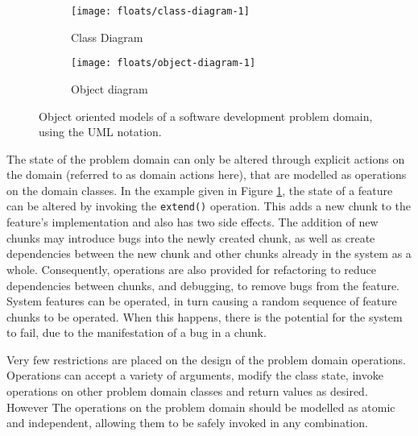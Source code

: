 \documentclass{sig-alternate}
\begin{document}
\begin{figure}
  \centering

  \begin{subfigure}{\linewidth}
    \centering
    \texttt{[image: floats/class-diagram-1]}
    \caption{Class Diagram}
    \label{fig:feature-class-diagram}
  \end{subfigure}

  \vspace{10pt}

  \begin{subfigure}{\linewidth}
    \centering 
    \texttt{[image: floats/object-diagram-1]}
    \caption{Object diagram}
    \label{fig:feature-instance-diagram}
  
  \end{subfigure}

  \vspace{10pt}

  
  \caption{Object oriented models of a software development problem domain,
    using the UML notation.}

\end{figure}

The state of the problem domain can only be altered through explicit actions on
the domain (referred to as domain actions here), that are modelled as operations
on the domain classes.  In the example given in Figure
\ref{fig:feature-class-diagram}, the state of a feature can be altered by
invoking the \lstinline!extend()!  operation.  This adds a new chunk to the
feature's implementation and also has two side effects. The addition of new
chunks may introduce bugs into the newly created chunk, as well as create
dependencies between the new chunk and other chunks already in the system as a
whole.  Consequently, operations are also provided for refactoring to reduce
dependencies between chunks, and debugging, to remove bugs from the feature.
System features can be operated, in turn causing a random sequence of feature
chunks to be operated.  When this happens, there is the potential for the system
to fail, due to the manifestation of a bug in a chunk.

Very few restrictions are placed on the design of the problem domain operations.
Operations can accept a variety of arguments, modify the class state, invoke
operations on other problem domain classes and return values as desired.
However The operations on the problem domain should be modelled as atomic and
independent, allowing them to be safely invoked in any combination.
\end{document}
